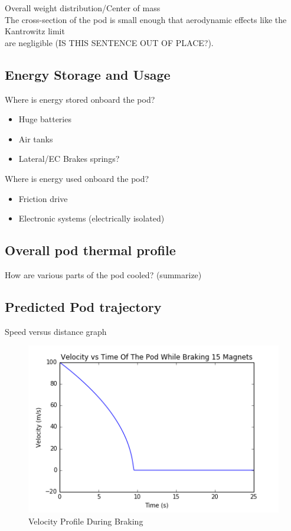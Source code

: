 \documentclass[main.tex]{subfiles}
\begin{document}
Overall weight distribution/Center of mass\\
The cross-section of the pod is small enough that aerodynamic effects like the Kantrowitz limit\\
are negligible (IS THIS SENTENCE OUT OF PLACE?).\\

\subsection{Energy Storage and Usage}
Where is energy stored onboard the pod?
\begin{itemize}
    \item Huge batteries
    \item Air tanks
    \item Lateral/EC Brakes springs?
\end{itemize}
Where is energy used onboard the pod?
\begin{itemize}
    \item Friction drive
    \item Electronic systems (electrically isolated)
\end{itemize}

\subsection{Overall pod thermal profile}
How are various parts of the pod cooled? (summarize)

\subsection{Predicted Pod trajectory}
Speed versus distance graph
\begin{figure}
        \centering
        \includegraphics[width=\linewidth]{images/velocity_time_graph}
        \caption{Velocity Profile During Braking}
        \label{fig:velocity-profile}
    \end{figure}
    
\end{document}
